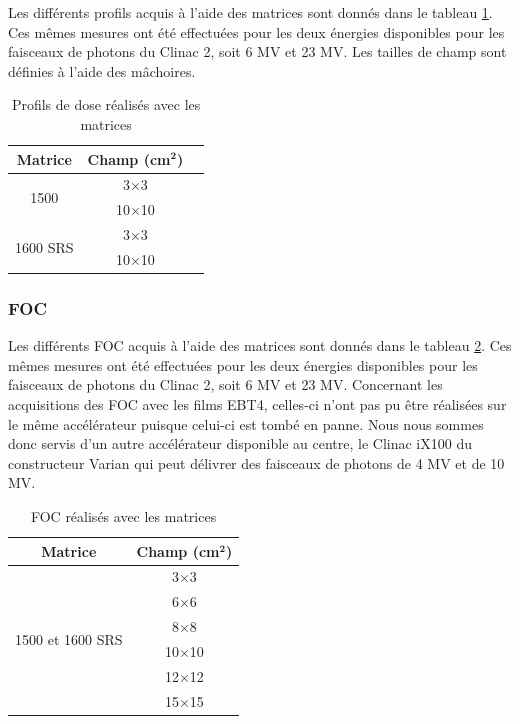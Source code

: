 \documentclass{book}
\begin{document}
Les différents profils acquis à l'aide des matrices sont donnés dans le tableau \ref*{table_profils_matrices}. Ces mêmes mesures ont été effectuées pour les deux énergies disponibles pour les faisceaux de photons du Clinac 2, soit 6 MV et 23 MV. Les tailles de champ sont définies à l'aide des mâchoires.

\begin{table}[h]
  \centering
  \begin{tabular}{ccc}
  \toprule
  \textbf{Matrice} & \textbf{Champ} \textbf{(cm}$\mathbf{^2}$\textbf{)}\\ \toprule
  \multirow{2}{*}{1500} & 3$\times$3 \\
    & 10$\times$10 \\ \hline
  \multirow{2}{*}{1600 SRS} & 3$\times$3 \\
    & 10$\times$10 \\ \bottomrule
  \end{tabular}
  \caption{Profils de dose réalisés avec les matrices}
  \label{table_profils_matrices}
\end{table}

\subsubsection{FOC}

Les différents FOC acquis à l'aide des matrices sont donnés dans le tableau \ref*{table_foc_matrices}. Ces mêmes mesures ont été effectuées pour les deux énergies disponibles pour les faisceaux de photons du Clinac 2, soit 6 MV et 23 MV. Concernant les acquisitions des FOC avec les films EBT4, celles-ci n'ont pas pu être réalisées sur le même accélérateur puisque celui-ci est tombé en panne. Nous nous sommes donc servis d'un autre accélérateur disponible au centre, le Clinac iX100 du constructeur Varian qui peut délivrer des faisceaux de photons de 4 MV et de 10 MV.


\begin{table}[h]
  \centering
  \begin{tabular}{cc}
  \toprule
  \textbf{Matrice} & \textbf{Champ (cm}$\mathbf{^2}$\textbf{)}\\ \toprule
  \multirow{7}{*}{1500 et 1600 SRS} & 3$\times$3 \\
   & 6$\times$6 \\
   & 8$\times$8 \\
   & 10$\times$10 \\
   & 12$\times$12 \\
   & 15$\times$15 \\ \bottomrule
  \end{tabular}
  \caption{FOC réalisés avec les matrices}
  \label{table_foc_matrices}
\end{table}
\end{document}
